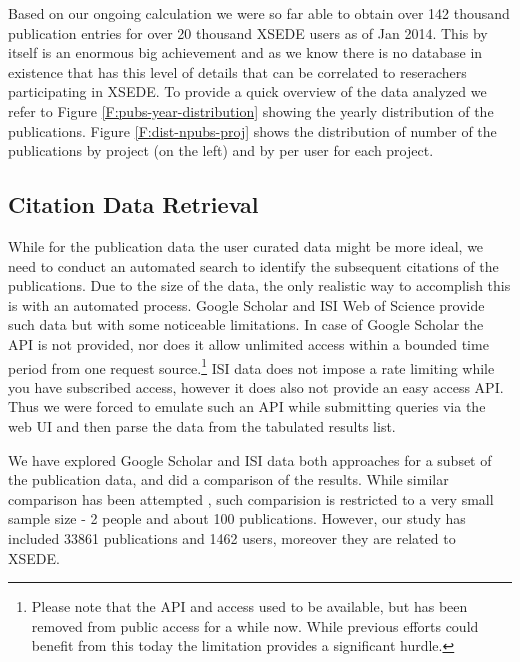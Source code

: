\documentclass{sig-alternate}
\begin{document}
Based on our ongoing calculation we were so far able to obtain over 142 thousand publication entries for over 20 thousand XSEDE users as of Jan 2014. 
This by itself is an enormous big achievement and as we know there is no database in existence that has this level of details that can be correlated to reserachers participating in XSEDE. To provide a quick overview of the data analyzed we refer to Figure \ref{F:pubs-year-distribution} showing the yearly distribution of the publications. Figure \ref{F:dist-npubs-proj} shows the distribution of number of the publications by project (on the left) and by per user for each project. 
 
\subsection{Citation Data Retrieval} 
 
While for the publication data the user curated data might be more ideal, we need to conduct an automated search to identify the subsequent citations of the publications. 
Due to the size of the data, the only realistic way to accomplish this is with an automated process. Google Scholar and ISI Web of Science provide such data but with some noticeable limitations. In case of Google Scholar the  API is not provided, nor does it allow unlimited access within a bounded time period from one request source.\footnote{Please note that the API and access used to be available, but has been removed from public access for a while now. While previous efforts could benefit from this today the limitation provides a significant hurdle.} ISI data does not impose a rate limiting while you have subscribed access, however it does also not provide an easy access API. Thus we were forced to emulate such an API while submitting queries via the web UI and then parse the data from the tabulated results list. 
 
We have explored Google Scholar and ISI data both approaches for a subset of the publication data, and did a comparison of the results. While similar comparison has been attempted \cite{yang2006citation}, such comparision is restricted to a very small sample size - 2 people and about 100 publications. However,  our study has included 33861 publications and 1462 users, moreover they are related to XSEDE.
 
\end{document}
